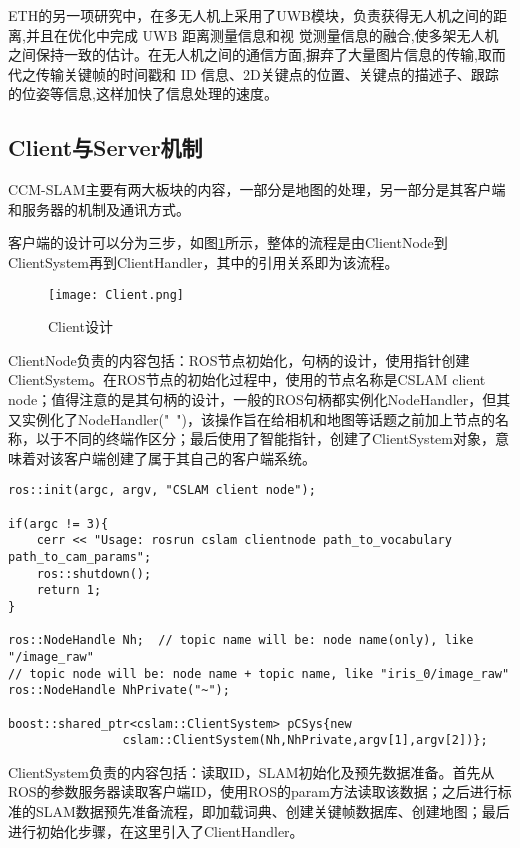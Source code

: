 ETH的另一项研究中，在多无人机上采用了UWB模块，负责获得无人机之间的距离,并且在优化中完成 UWB 距离测量信息和视
觉测量信息的融合,使多架无人机之间保持一致的估计。在无人机之间的通信方面,摒弃了大量图片信息的传输,取而代之传输关键帧的时间戳和 ID 信息、2D关键点的位置、关键点的描述子、跟踪的位姿等信息,这样加快了信息处理的速度\cite{karrer2021distributed}。


\subsection{Client与Server机制} \label{3.3.2}

CCM-SLAM主要有两大板块的内容，一部分是地图的处理，另一部分是其客户端和服务器的机制及通讯方式。

客户端的设计可以分为三步，如图\ref{fig12}所示，整体的流程是由ClientNode到ClientSystem再到ClientHandler，其中的引用关系即为该流程。

\begin{figure}[!ht]
	\centering
	\texttt{[image: Client.png]}
	\caption{Client设计}
	\label{fig12}
\end{figure}

ClientNode负责的内容包括：ROS节点初始化，句柄的设计，使用指针创建ClientSystem。在ROS节点的初始化过程中，使用的节点名称是CSLAM client node；值得注意的是其句柄的设计，一般的ROS句柄都实例化NodeHandler，但其又实例化了NodeHandler("~")，该操作旨在给相机和地图等话题之前加上节点的名称，以于不同的终端作区分；最后使用了智能指针，创建了ClientSystem对象，意味着对该客户端创建了属于其自己的客户端系统。

\begin{verbatim}
ros::init(argc, argv, "CSLAM client node");

if(argc != 3){
    cerr << "Usage: rosrun cslam clientnode path_to_vocabulary path_to_cam_params";
    ros::shutdown();
    return 1;
}

ros::NodeHandle Nh;  // topic name will be: node name(only), like "/image_raw"
// topic node will be: node name + topic name, like "iris_0/image_raw"
ros::NodeHandle NhPrivate("~"); 

boost::shared_ptr<cslam::ClientSystem> pCSys{new
                cslam::ClientSystem(Nh,NhPrivate,argv[1],argv[2])};
\end{verbatim}

ClientSystem负责的内容包括：读取ID，SLAM初始化及预先数据准备。首先从ROS的参数服务器读取客户端ID，使用ROS的param方法读取该数据；之后进行标准的SLAM数据预先准备流程，即加载词典、创建关键帧数据库、创建地图；最后进行初始化步骤，在这里引入了ClientHandler。

